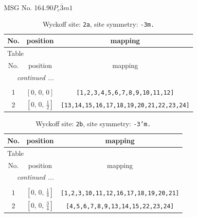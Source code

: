 \documentclass[fleqn,8pt]{jsarticle}
\begin{document}
\setcounter{MaxMatrixCols}{32}

\renewcommand{\tablename}{Table~}
\renewcommand{\figurename}{Figure~}
\begin{center}
\LARGE
MSG No. 164.90\quad$P_{c}\bar{3}m1$
\end{center}
\renewcommand{\arraystretch}{1.2}
\begin{longtable}{ccc}
\caption{Wyckoff site: {\tt 2a}, site symmetry: {\tt -3m.}}
 \\
 \hline \hline
No. & position & mapping \\ \hline \endfirsthead

\multicolumn{2}{l}{\tablename\ \thetable{}} \\
 \hline \hline
No. & position & mapping \\ \hline \endhead

 \hline \hline
\multicolumn{2}{r}{\footnotesize\it continued ...} \\ \endfoot

 \hline \hline
\multicolumn{2}{r}{} \\ \endlastfoot

1 & $\left[ 0,\, 0,\, 0 \right]$ & {\tt [1,2,3,4,5,6,7,8,9,10,11,12]} \\ \hline
2 & $\left[ 0,\, 0,\, \frac{1}{2} \right]$ & {\tt [13,14,15,16,17,18,19,20,21,22,23,24]} \\
\end{longtable}
\renewcommand{\arraystretch}{1.2}
\begin{longtable}{ccc}
\caption{Wyckoff site: {\tt 2b}, site symmetry: {\tt -3'm.}}
 \\
 \hline \hline
No. & position & mapping \\ \hline \endfirsthead

\multicolumn{2}{l}{\tablename\ \thetable{}} \\
 \hline \hline
No. & position & mapping \\ \hline \endhead

 \hline \hline
\multicolumn{2}{r}{\footnotesize\it continued ...} \\ \endfoot

 \hline \hline
\multicolumn{2}{r}{} \\ \endlastfoot

1 & $\left[ 0,\, 0,\, \frac{1}{4} \right]$ & {\tt [1,2,3,10,11,12,16,17,18,19,20,21]} \\ \hline
2 & $\left[ 0,\, 0,\, \frac{3}{4} \right]$ & {\tt [4,5,6,7,8,9,13,14,15,22,23,24]} \\
\end{longtable}
\end{document}
